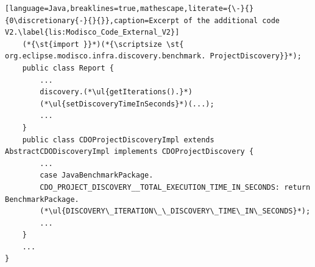 \begin{lstlisting}[language=Java,breaklines=true,mathescape,literate={\-}{}{0\discretionary{-}{}{}},caption=Excerpt of the additional code V2.\label{lis:Modisco_Code_External_V2}]
	(*{\st{import }}*)(*{\scriptsize \st{ org.eclipse.modisco.infra.discovery.benchmark. ProjectDiscovery}}*);
	public class Report {
		...
		discovery.(*\ul{getIterations().}*) 
		(*\ul{setDiscoveryTimeInSeconds}*)(...);
		...
	}
	public class CDOProjectDiscoveryImpl extends AbstractCDODiscoveryImpl implements CDOProjectDiscovery {
		...
		case JavaBenchmarkPackage.
		CDO_PROJECT_DISCOVERY__TOTAL_EXECUTION_TIME_IN_SECONDS: return BenchmarkPackage.
		(*\ul{DISCOVERY\_ITERATION\_\_DISCOVERY\_TIME\_IN\_SECONDS}*);
		...
	}
	...
}
\end{lstlisting}

